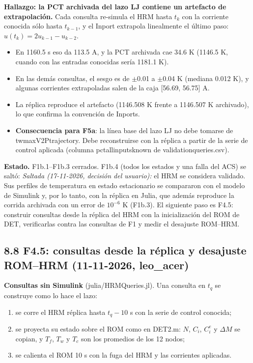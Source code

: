 \documentclass[11pt,a4paper]{article}
\newcommand{\codeus}{\textunderscore\allowbreak}
\newcommand{\code}[1]{{\small\ttfamily\let\_\codeus #1}}
\begin{document}
\textbf{Hallazgo: la PCT archivada del lazo LJ contiene un artefacto de extrapolación.} Cada consulta re-simula el HRM hasta $t_k$ con la corriente conocida sólo hasta $t_{k-1}$, y el Inport extrapola linealmente el último paso: $u(t_k)=2u_{k-1}-u_{k-2}$.

\begin{itemize}
\item En 1160.5 s eso da 113.5 A, y la PCT archivada cae 34.6 K (1146.5 K, cuando con las entradas conocidas sería 1181.1 K).
\item En las demás consultas, el sesgo es de $\pm$0.01 a $\pm$0.04 K (mediana 0.012 K), y algunas corrientes extrapoladas salen de la caja [56.69, 56.75] A.
\item La réplica reproduce el artefacto (1146.508 K frente a 1146.507 K archivado), lo que confirma la convención de Inports.
\item \textbf{Consecuencia para F5a}: la línea base del lazo LJ no debe tomarse de \code{tw\_max\_V2P\_trajectory}. Debe reconstruirse con la réplica a partir de la serie de control aplicada (columna \code{pct\_all\_inputs\_known} de \code{validation\_1180\_queries.csv}).
\end{itemize}

\textbf{Estado.} F1b.1–F1b.3 cerrados. F1b.4 (todos los estados y una falla del ACS) se saltó: \emph{Saltada (17-11-2026, decisión del usuario):} el HRM se considera validado. Sus perfiles de temperatura en estado estacionario se compararon con el modelo de Simulink y, por lo tanto, con la réplica en Julia, que además reproduce la corrida archivada con un error de $10^{-6}$ K (F1b.3). El siguiente paso es F4.5: construir consultas desde la réplica del HRM con la inicialización del ROM de \code{DET\_2}, verificarlas contra las consultas de F1 y medir el desajuste ROM–HRM.

\subsection*{8.8 F4.5: consultas desde la réplica y desajuste ROM–HRM (11-11-2026, leo\_acer)}
\textbf{Consultas sin Simulink} (\code{julia/HRMQueries.jl}). Una consulta en $t_q$ se construye como lo hace el lazo:

\begin{enumerate}
\item se corre el HRM réplica hasta $t_q-10$ s con la serie de control conocida;
\item se proyecta su estado sobre el ROM como en \code{DET\_2.m}: $N$, $C_i$, $C^e_i$ y $\Delta M$ se copian, y $T_f$, $T_w$ y $T_c$ son los promedios de los 12 nodos;
\item se calienta el ROM 10 s con la fuga del HRM y las corrientes aplicadas.
\end{enumerate}
\end{document}
